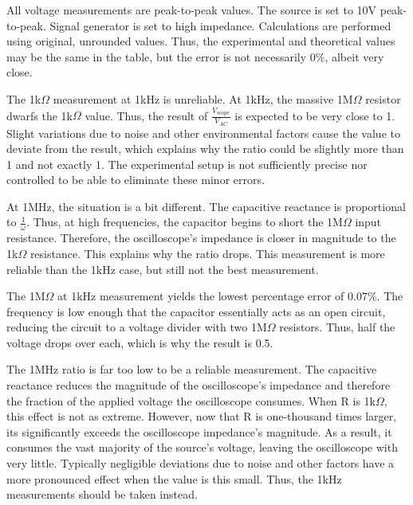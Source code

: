 All voltage measurements are peak-to-peak values. The source is set to 10V peak-to-peak. Signal generator is set to high impedance.
Calculations are performed using original, unrounded values. Thus, the experimental and theoretical values may be the same in the table, but the error is not necessarily 0\%, albeit very close.


The 1k$\Omega$ measurement at 1kHz is unreliable. At 1kHz, the massive 1M$\Omega$ resistor dwarfs the 1k$\Omega$ value. Thus, the result of $\frac{V_{scope}}{V_{AC}}$ is expected to be very close to 1. Slight variations due to noise and other environmental factors cause the value to deviate from the result, which explains why the ratio could be slightly more than 1 and not exactly 1. The experimental setup is not sufficiently precise nor controlled to be able to eliminate these minor errors.

At 1MHz, the situation is a bit different. The capacitive reactance is proportional to $\frac{1}{\omega}$. Thus, at high frequencies, the capacitor begins to short the 1M$\Omega$ input resistance. Therefore, the oscilloscope's impedance is closer in magnitude to the 1k$\Omega$ resistance. This explains why the ratio drops. This measurement is more reliable than the 1kHz case, but still not the best measurement.

The 1M$\Omega$ at 1kHz measurement yields the lowest percentage error of 0.07\%. The frequency is low enough that the capacitor essentially acts as an open circuit, reducing the circuit to a voltage divider with two 1M$\Omega$ resistors. Thus, half the voltage drops over each, which is why the result is 0.5.

The 1MHz ratio is far too low to be a reliable measurement. The capacitive reactance reduces the magnitude of the oscilloscope's impedance and therefore the fraction of the applied voltage the oscilloscope consumes. When R is 1k$\Omega$, this effect is not as extreme. However, now that R is one-thousand times larger, its significantly exceeds the oscilloscope impedance's magnitude. As a result, it consumes the vast majority of the source's voltage, leaving the oscilloscope with very little. Typically negligible deviations due to noise and other factors have a more pronounced effect when the value is this small. Thus, the 1kHz measurements should be taken instead.


